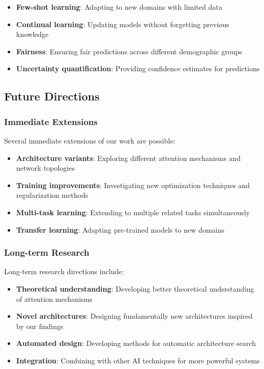 \begin{itemize}
    \item \textbf{Few-shot learning}: Adapting to new domains with limited data
    \item \textbf{Continual learning}: Updating models without forgetting previous knowledge
    \item \textbf{Fairness}: Ensuring fair predictions across different demographic groups
    \item \textbf{Uncertainty quantification}: Providing confidence estimates for predictions
\end{itemize}

\subsection{Future Directions}

\subsubsection{Immediate Extensions}

Several immediate extensions of our work are possible:

\begin{itemize}
    \item \textbf{Architecture variants}: Exploring different attention mechanisms and network topologies
    \item \textbf{Training improvements}: Investigating new optimization techniques and regularization methods
    \item \textbf{Multi-task learning}: Extending to multiple related tasks simultaneously
    \item \textbf{Transfer learning}: Adapting pre-trained models to new domains
\end{itemize}

\subsubsection{Long-term Research}

Long-term research directions include:

\begin{itemize}
    \item \textbf{Theoretical understanding}: Developing better theoretical understanding of attention mechanisms
    \item \textbf{Novel architectures}: Designing fundamentally new architectures inspired by our findings
    \item \textbf{Automated design}: Developing methods for automatic architecture search
    \item \textbf{Integration}: Combining with other AI techniques for more powerful systems
\end{itemize}

